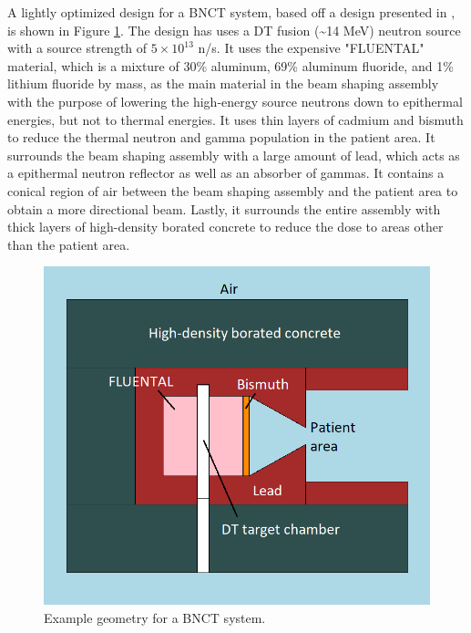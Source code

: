 A lightly optimized design for a BNCT system, based off a design presented in \cite{monshizadeh2015}, is shown in Figure \ref{fig:proposal:bnct_geom}.
The design has uses a DT fusion (\textasciitilde 14 MeV) neutron source with a source strength of $5\times 10^{13}$ n/s.
It uses the expensive "FLUENTAL" material, which is a mixture of 30\% aluminum, 69\% aluminum fluoride, and 1\% lithium fluoride by mass, as the main material in the beam shaping assembly with the purpose of lowering the high-energy source neutrons down to epithermal energies, but not to thermal energies.
It uses thin layers of cadmium and bismuth to reduce the thermal neutron and gamma population in the patient area.
It surrounds the beam shaping assembly with a large amount of lead, which acts as a epithermal neutron reflector as well as an absorber of gammas.
It contains a conical region of air between the beam shaping assembly and the patient area to obtain a more directional beam.
Lastly, it surrounds the entire assembly with thick layers of high-density borated concrete to reduce the dose to areas other than the patient area.
\begin{figure}[h!]
  \centering
  \includegraphics[width=0.75\linewidth]{content/proposal/BNCT_geom.png}
  \caption{Example geometry for a BNCT system.}
  \label{fig:proposal:bnct_geom}
\end{figure}


